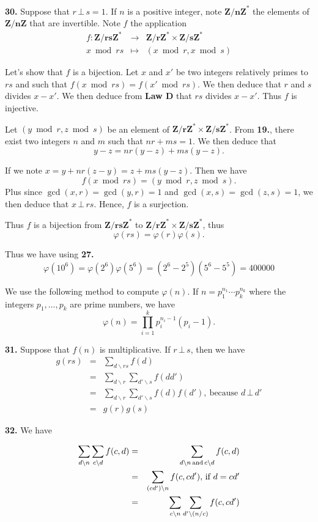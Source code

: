 \documentclass[a4paper,12pt]{article}
\newcommand{\newpar}[1]{\bigskip \noindent \textbf{#1.}}
\begin{document}
\newpar{30}  Suppose that $r\,\bot\,s = 1$.  If $n$ is a positive
integer, note $\mathbf{Z/nZ}^*$ the elements of $\mathbf{Z/nZ}$ that
are invertible.  Note $f$ the application
\begin{eqnarray*}
  f: \mathbf{Z/rsZ}^* &\longrightarrow& \mathbf{Z/rZ}^* \times
  \mathbf{Z/sZ}^* \\
  x \bmod{rs} &\longmapsto& (x \bmod{r}, x\bmod{s})
\end{eqnarray*}

Let's show that $f$ is a bijection.  Let $x$ and $x'$ be two integers
relatively primes to $rs$ and such that $f(x\bmod{rs}) =
f(x'\bmod{rs})$.  We then deduce that $r$ and $s$ divides $x - x'$.
We then deduce from \textbf{Law D} that $rs$ divides $x-x'$.  Thus $f$
is injective.

Let $(y\bmod r, z\bmod s)$ be an element of $\mathbf{Z/rZ}^*\times
\mathbf{Z/sZ}^*$.  From \textbf{19.}, there exist two integers $n$ and
$m$ such that $n r + m s = 1$.  We then deduce that
\[y-z = nr(y-z) + ms(y-z).\]

If we note $x = y + nr(z-y) = z + ms(y-z)$.  Then we have
\[f(x\bmod{rs}) = (y \bmod r, z\bmod s).\]
Plus since $\gcd(x, r) = \gcd(y, r) = 1$ and $\gcd(x, s) = \gcd(z, s)
= 1$, we then deduce that $x\,\bot\,rs$.  Hence, $f$ is a surjection.

Thus $f$ is a bijection from $\mathbf{Z/rsZ}^*$ to
$\mathbf{Z/rZ}^*\times\mathbf{Z/sZ}^*$, thus \[\varphi(rs) = \varphi(r)
\varphi(s).\]

Thus we have using \textbf{27.}
\[ \varphi(10^6) = \varphi(2^6) \varphi(5^6) = (2^6 - 2^5)(5^6 - 5^5)
= 400000\]

We use the following method to compute $\varphi(n)$.  If $n =
p_1^{n_1}\cdots p_k^{n_k}$ where the integers $p_1, \ldots, p_k$ are
prime numbers, we have
\[ \varphi(n) = \prod_{i=1}^kp_i^{n_i-1}(p_i-1).\]

\newpar{31} Suppose that $f(n)$ is multiplicative.  If $r\,\bot\,s$,
then we have
\begin{eqnarray*}
  g(rs) &=& \sum_{d\backslash rs}f(d) \\
  &=& \sum_{d\backslash r}\sum_{d'\backslash s}f(dd') \\
  &=& \sum_{d\backslash r} \sum_{d'\backslash s} f(d)
  f(d'),\ \mbox{because $d\,\bot\,d'$} \\
  &=& g(r) g(s)
\end{eqnarray*}

\newpar{32} We have

\begin{eqnarray*}
  \sum_{d \char92 n} \sum_{c \char92 d} f(c, d) &=& \sum_{d \char92
    n\,\mathrm{and}\,c\char92 d} f(c, d) \\
  &=& \sum_{(cd')\char92 n}f(c, cd'),\,\mbox{if $d = cd'$} \\
  &=& \sum_{c \char92 n} \sum_{d'\char92 (n/c)} f(c, cd')
\end{eqnarray*}
\end{document}
